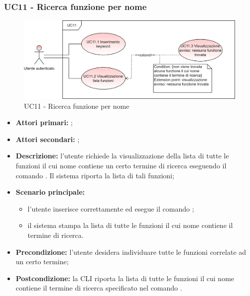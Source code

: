 \subsubsection{UC11 - Ricerca funzione per nome}
\begin{figure}[H]
	\centering
	\includegraphics[scale=\ucs]{./res/img/UC11.png}
	\caption {UC11 - Ricerca funzione per nome}
\end{figure}
\begin{itemize}
	\item \textbf{Attori primari:} \ua{};
	\item \textbf{Attori secondari:} \re{};
	\item \textbf{Descrizione:} l’utente richiede la visualizzazione della lista di tutte le funzioni il cui nome contiene un certo termine di ricerca eseguendo il comando \psearch{}. Il sistema riporta la lista di tali funzioni;
	\item \textbf{Scenario principale:} 
	\begin{itemize}
		\item l’utente inserisce correttamente ed esegue il comando \psearch{};
		\item il sistema stampa la lista di tutte le funzioni il cui nome contiene il termine di ricerca.
	\end{itemize}
	\item \textbf{Precondizione:} l’utente desidera individuare tutte le funzioni correlate ad un certo termine;
	\item \textbf{Postcondizione:} la CLI riporta la lista di tutte le funzioni il cui nome contiene il termine di ricerca specificato nel comando \search{}.
\end{itemize}